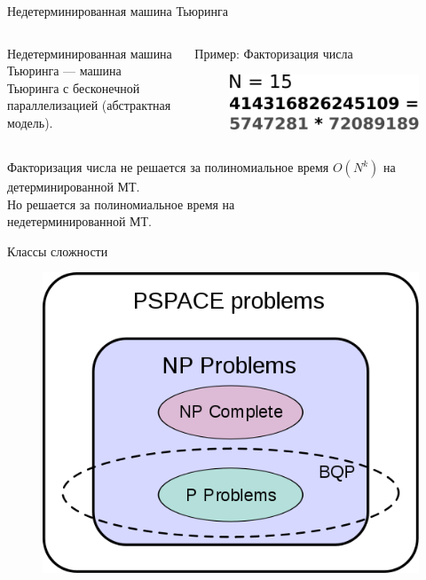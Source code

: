 \documentclass[newPxFont]{beamer}
\begin{document}
\begin{frame}{Недетерминированная машина Тьюринга}
\begin{columns}
\begin{column}{.48\linewidth}
Недетерминированная машина Тьюринга — машина Тьюринга с бесконечной параллелизацией (абстрактная модель).
\end{column}
\begin{column}{.48\linewidth}
Пример: Факторизация числа
		\begin{figure}
		\centerline{\includegraphics[width=1.0\linewidth]{images/factorization.png}}
		\end{figure}
	\end{column}
	\end{columns}

\begin{alertblock}{}
Факторизация числа не решается за полиномиальное время $O(N^k)$ на детерминированной МТ.\\
Но решается за полиномиальное время на \\
недетерминированной МТ.
\end{alertblock}

\end{frame}



\begin{frame}{Классы сложности}
\begin{figure}
\centerline{\includegraphics[width=0.75\linewidth]{images/complexities.png}}
\end{figure}
\end{frame}
\end{document}
